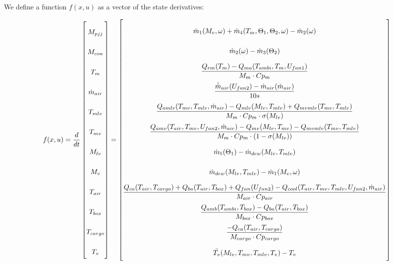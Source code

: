 We define a function $f(x,u)$ as a vector of the state derivatives:

\begin{equation} \label{eq:f_noSub} \renewcommand{\arraystretch}{2.4}
	f(x,u) =  \dfrac{d}{dt} \begin{bmatrix}
		M_{pjj}			\\				%
		M_{con} 		\\				%
		T_m 			\\				%
		\dot{m}_{air}	\\				%
		T_{mlv}			\\				%
		T_{mv}			\\				%
		M_{lv}			\\				%
		M_v				\\				%
		T_{air}			\\				%
		T_{box}			\\				%
		T_{cargo}		\\				%
		T_v				\\				%

	\end{bmatrix}
	=
	\begin{bmatrix}
		\dot{m}_1(M_{v}, \omega) + \dot{m}_4(T_m,\Theta_1,\Theta_2,\omega) - \dot{m}_2(\omega) \\										%
		\dot{m}_{2}(\omega) - \dot{m}_{3}(\Theta_2)	\\												%
		\dfrac{Q_{rm}(T_m) - Q_{ma}(T_{ambi}, T_m, U_{fan1})}{M_m \cdot Cp_m} \\									%
		\dfrac{\bar{\dot{m}}_{air}(U_{fan2})  - \dot{m}_{air}(\dot{m}_{air})} {10s}		\\					%
		\dfrac{Q_{amlv}(T_{mv},T_{mlv},\dot{m}_{air})-Q_{mlv}(M_{lv},T_{mlv}) + Q_{mvmlv}(T_{mv},T_{mlv})}{M_m \cdot Cp_m \cdot \sigma(M_{lv})}        \\	%
		\dfrac{Q_{amv}(T_{air},T_{mv},U_{fan2},\dot{m}_{air}) - Q_{mv}(M_{lv},T_{mv}) - Q_{mvmlv}(T_{mv},T_{mlv})}{M_m \cdot Cp_m \cdot (1- \sigma(M_{lv}))}	\\	%
		\dot{m}_{5}(\Theta_1) - \dot{m}_{dew}(M_{lv},T_{mlv})		\\											%
		\dot{m}_{dew}(M_{lv},T_{mlv}) - \dot{m}_1(M_{v}, \omega)	\\												%
		\dfrac{Q_{ca}(T_{air},T_{cargo}) + Q_{ba}(T_{air},T_{box}) + Q_{fan}(U_{fan2}) - Q_{cool}(T_{air},T_{mv},T_{mlv},U_{fan2},\dot{m}_{air})}{M_{air} \cdot Cp_{air}} \\					%
		\dfrac{Q_{amb}(T_{ambi},T_{box}) -  Q_{ba}(T_{air},T_{box})}{M_{box} \cdot Cp_{box}} \\							%
		\dfrac{-Q_{ca}(T_{air},T_{cargo})}{M_{cargo} \cdot Cp_{cargo}}									\\	%
		\bar{T_v}(M_{lv},T_{mv},T_{mlv},T_v) - T_v 
	\end{bmatrix}
\end{equation}


